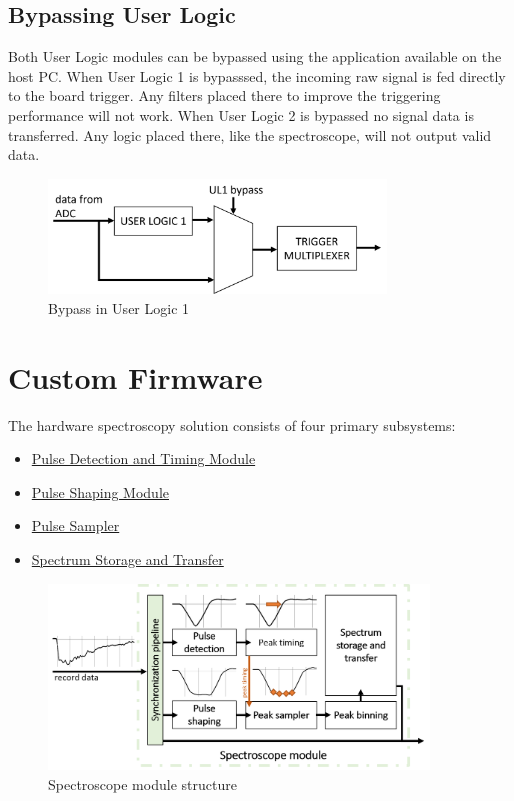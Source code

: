 \documentclass[a4paper,12pt,table]{article}
\begin{document}
	\subsection{Bypassing User Logic}
		Both User Logic modules can be bypassed using the application available on the host PC. 
		When User Logic 1 is bypasssed, the incoming raw signal is fed directly to the board 
		trigger. Any filters placed there to improve the triggering performance will not work.
		When User Logic 2 is bypassed no signal data is transferred.
		Any logic placed there, like the spectroscope, will not output valid data.
		\begin{figure}[!h]
			\centering
			\includegraphics[width=0.8\textwidth]{img/user_logic_1_bypass.png}
			\caption{Bypass in User Logic 1}\label{fig:user_logic_1_bypass}
		\end{figure}
\newpage
\section{Custom Firmware}
	The hardware spectroscopy solution consists of four primary subsystems:

	\begin{itemize}
		\item \hyperref[ssec:pulse_detection_module]{Pulse Detection and Timing Module}
		\item \hyperref[ssec:pulse_shaping_module]{Pulse Shaping Module}
		\item \hyperref[ssec:pulse_sampler]{Pulse Sampler}
		\item \hyperref[ssec:spectrum_storage_and_transfer]{Spectrum Storage and Transfer}
	\end{itemize}

	\begin{figure}[!h]
		\centering
		\includegraphics[width=0.9\textwidth]{img/user_logic_2_filters.png}
		\caption{Spectroscope module structure}\label{fig:user_logic_2_filters}
	\end{figure}
\end{document}
